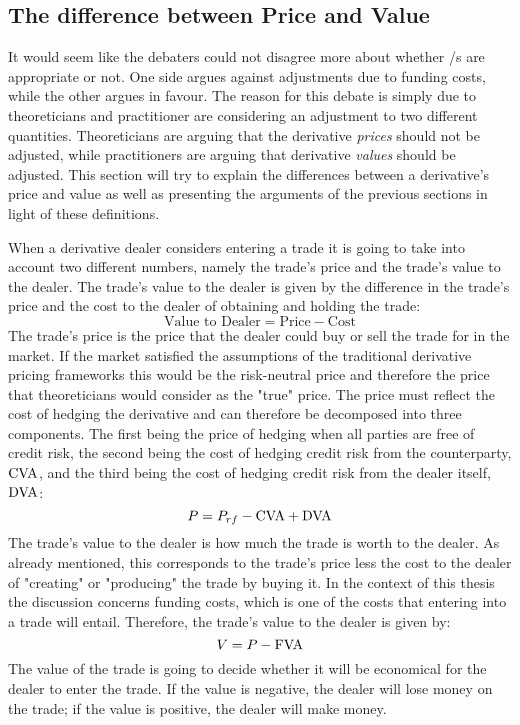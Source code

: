 \documentclass[main.tex]{subfiles}
\begin{document}
    \subsection{The difference between Price and Value}

    It would seem like the debaters could not disagree more 
    about whether \FVA/s are appropriate or not.
    One side argues against adjustments due to funding costs, while the other argues in favour.
    The reason for this debate is simply due to theoreticians and practitioner
    are considering an adjustment to two different quantities.
    Theoreticians are arguing that the derivative \textit{prices} should not be adjusted,
    while practitioners are arguing that derivative \textit{values} should be adjusted.
    This section will try to explain the differences between a derivative's price and value
    as well as presenting the arguments of the previous sections in light of these definitions.

    When a derivative dealer considers entering a trade it is going to take into account
    two different numbers, namely the trade's price and the trade's value to the dealer.
    The trade's value to the dealer is given by the difference in the trade's price
    and the cost to the dealer of obtaining and holding the trade:
        \begin{equation}
            \text{Value to Dealer} 
            =
            \text{Price}
            -
            \text{Cost}
        \end{equation}
    The trade's price is the price that the dealer could buy or sell the trade for in the market.
    If the market satisfied the assumptions of the traditional derivative pricing frameworks
    this would be the risk-neutral price and therefore the price that 
    theoreticians would consider as the "true" price.
    The price must reflect the cost of hedging the derivative
    and can therefore be decomposed into three components. 
    The first being the price of hedging when all parties are free of credit risk, 
    the second being the cost of hedging credit risk from the counterparty, $\CVA/$,
    and the third being the cost of hedging credit risk from the dealer itself, $\DVA/$:
        \begin{equation}
            P = 
            P_{rf} 
            -
            \CVA/
            +
            \DVA/
        \end{equation}
    The trade's value to the dealer is how much the trade is worth to the dealer.
    As already mentioned, this corresponds to the trade's price less the cost to the dealer
    of "creating" or "producing" the trade by buying it.
    In the context of this thesis the discussion concerns funding costs,
    which is one of the costs that entering into a trade will entail.
    Therefore, the trade's value to the dealer is given by:
        \begin{equation}
            V = P - \FVA/
        \end{equation}
    The value of the trade is going to decide whether it will be economical 
    for the dealer to enter the trade. 
    If the value is negative, the dealer will lose money on the trade;
    if the value is positive, the dealer will make money.
    
\end{document}
